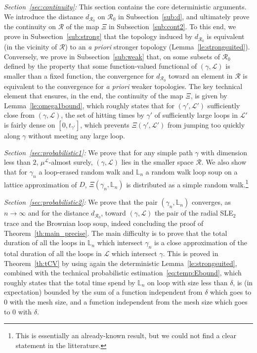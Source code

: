 \documentclass[11pt]{article}
\def\Conf{{\mathscr{R}}}
\def\Att{{\Xi}}
\begin{document}
\emph{\it Section~\ref{sec:continuity}:} This section contains the core deterministic arguments. We introduce the distance $d_{\Conf_0}$ on $\Conf_0$ in Subsection~\ref{sub:d}, and ultimately prove the continuity  on $\Conf$ of the map $\Att$ in Subsection~\ref{sub:cont2}. To this end, we prove in Subsection~\ref{sub:strong} that the topology induced by
$d_{\Conf_0}$ is equivalent (in the vicinity of $\Conf$) to an {\it a priori} stronger topology (Lemma~\ref{le:strongsuited}).
Conversely, we prove in Subsection~\ref{sub:weak} that, on some subsets of $\Conf_0$ defined by the property that some function-valued functional of $(\gamma,\mathcal{L})$ is smaller than a fixed function, the convergence for $d_{\Conf_0}$ toward an element in $\Conf$ is equivalent to the convergence for {\it a priori} weaker topologies. The key technical element that ensures, in the end, the continuity of the map $\Att$, is given by Lemma~\ref{le:omega1bound}, which roughly states that for $(\gamma',\mathcal{L}')$ sufficiently close from  $(\gamma,\mathcal{L})$, the set of hitting times by $\gamma'$ of sufficiently large loops in $\mathcal{L}'$ is fairly dense on $[0,t_{\gamma'}]$, which prevents $\Att(\gamma',\mathcal{L}')$ from jumping too quickly along $\gamma$ without meeting any large loop.

\emph{\it Section~\ref{sec:probabilistic1}:} We prove that for any simple path $\gamma$ with dimension less than $2$, $\mu^{\mathcal{L}}$-almost surely, $(\gamma, \mathcal{L})$ lies in the smaller space $\Conf$. We also show that for $\gamma_n$ a loop-erased random walk and $\mathbb{L}_n$ a random walk loop soup on a lattice approximation of $D$, $\Att(\gamma_n, \mathbb{L}_n)$
is distributed as a simple random walk.\footnote{This is essentially an already-known result, but we could not find a clear statement in the litterature.}

\emph{\it Section~\ref{sec:probabilistic2}:} We prove that the pair $(\gamma_n, \mathbb{L}_n)$ converges, as $n\to \infty$ and for the distance $d_{\Conf_0}$, toward $(\gamma,\mathcal{L})$ the pair of the radial SLE$_2$ trace and the Brownian loop soup, indeed concluding the proof of Theorem~\ref{th:main_precise}.
The main difficulty is to prove that the total duration of all the loops in $\mathbb{L}_n$ which intersect $\gamma_n$ is a close approximation of the total duration of all the loops in $\mathcal{L}$ which intersect $\gamma$. This is proved in Theorem~\ref{th:tCV} by using again the deterministic Lemma~\ref{le:strongsuited}, combined with the technical probabilistic estimation~\eqref{eq:temp:Ebound}, which roughly states that the total time spend by $\mathbb{L}_n$ on loop with size less than $\delta$, is (in expectation) bounded by the sum of a function independent from $\delta$ which goes to
$0$ with the mesh size, and a  function independent from the mesh size which goes to $0$ with $\delta$.
\end{document}

